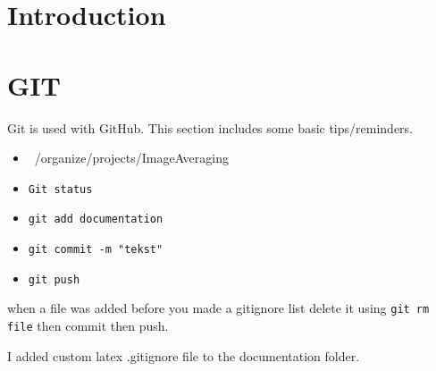 \documentclass[10pt,a4paper]{report}
\author{Jeroen Keizer}
\begin{document}
\section{Introduction}
\section{GIT}
Git is used with GitHub.
This section includes some basic tips/reminders.
\begin{itemize}
\item ~/organize/projects/ImageAveraging
\item \verb|Git status|
\item \verb|git add documentation|
\item \verb|git commit -m "tekst"|
\item \verb|git push|
\end{itemize}
when a file was added before you made a gitignore list delete it using \verb|git rm file| then commit then push.

I added custom latex .gitignore file to the documentation folder.
\end{document}
